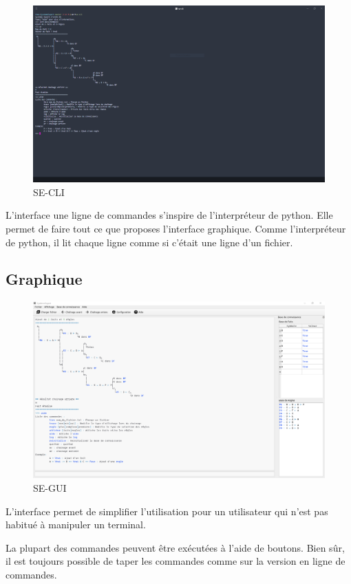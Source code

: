 \documentclass[a4paper, 11pt]{article}
\begin{document}
\begin{figure}[H]
    \centering
    \includegraphics[width=12cm]{cli.png}
    \caption{\label{cli} SE-CLI}
\end{figure}

L'interface une ligne de commandes s'inspire de l'interpréteur de python. Elle permet de faire tout ce que proposes l'interface graphique. Comme l'interpréteur de python, il lit chaque ligne comme si c'était une ligne d'un fichier.

\subsection{Graphique}

\begin{figure}[H]
    \centering
    \includegraphics[width=12cm]{gui.png}
    \caption{\label{gui} SE-GUI}
\end{figure}

L'interface permet de simplifier l'utilisation pour un utilisateur qui n'est pas habitué à manipuler un terminal.

La plupart des commandes peuvent être exécutées à l'aide de boutons. Bien sûr, il est toujours possible de taper les commandes comme sur la version en ligne de commandes.
\end{document}
